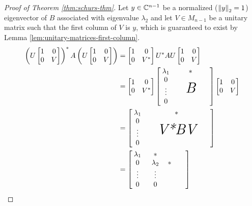 \begin{proof}[Proof of Theorem \ref{thm:schurs-thm}]
\noindent Let $y \in \mathbb C^{n-1}$ be a normalized ($\left\lVert y\right\rVert_2 = 1$) eigenvector of $B$ associated with eigenvalue $\lambda_2$ and let $V \in M_{n-1}$ be a unitary matrix such that the first column of $V$ is $y$, which is guaranteed to exist by Lemma \ref{lem:unitary-matrices-first-column}.
\begin{align*}
    \left(U\begin{bmatrix}1 & 0 \\ 0 & V\end{bmatrix}\right)^*
    A
    \left(U\begin{bmatrix}1 & 0 \\ 0 & V\end{bmatrix}\right) 
    &= 
    \begin{bmatrix}1 & 0 \\ 0 & V^*\end{bmatrix} 
    U^*AU 
    \begin{bmatrix}1 & 0 \\ 0 & V\end{bmatrix} \\
    &= 
    \begin{bmatrix}1 & 0 \\ 0 & V^*\end{bmatrix} 
    \begin{bmatrix} \lambda_1 & & * & & \\ \begin{array}{c} 0 \\ \vdots \\ 0 \end{array} & & \textit{\huge B} & & \end{bmatrix}
    \begin{bmatrix}1 & 0 \\ 0 & V\end{bmatrix} \\
    &= 
    \begin{bmatrix} \lambda_1 & & * & & \\ \begin{array}{c} 0 \\ \vdots \\ 0 \end{array} & & \textit{\huge V*BV} & & \end{bmatrix} \\
    &= 
    \begin{bmatrix} 
        \lambda_1 & * & & & \\ 
        0 & \lambda_2 & * & & \\ 
        \begin{array}{c} \vdots \\ 0 \end{array} & \begin{array}{c} \vdots \\ 0 \end{array} & 

\end{bmatrix}
\end{align*}
\end{proof}
